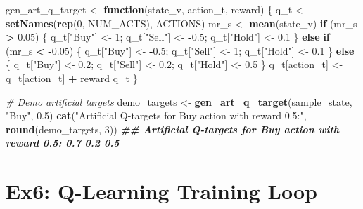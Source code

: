 \documentclass[
]{article}
\newenvironment{Shaded}{\begin{snugshade}}{\end{snugshade}}
\newcommand{\CommentTok}[1]{\textcolor[rgb]{0.56,0.35,0.01}{\textit{#1}}}
\newcommand{\ControlFlowTok}[1]{\textcolor[rgb]{0.13,0.29,0.53}{\textbf{#1}}}
\newcommand{\DecValTok}[1]{\textcolor[rgb]{0.00,0.00,0.81}{#1}}
\newcommand{\DocumentationTok}[1]{\textcolor[rgb]{0.56,0.35,0.01}{\textbf{\textit{#1}}}}
\newcommand{\FloatTok}[1]{\textcolor[rgb]{0.00,0.00,0.81}{#1}}
\newcommand{\FunctionTok}[1]{\textcolor[rgb]{0.13,0.29,0.53}{\textbf{#1}}}
\newcommand{\NormalTok}[1]{#1}
\newcommand{\OtherTok}[1]{\textcolor[rgb]{0.56,0.35,0.01}{#1}}
\newcommand{\SpecialCharTok}[1]{\textcolor[rgb]{0.81,0.36,0.00}{\textbf{#1}}}
\newcommand{\StringTok}[1]{\textcolor[rgb]{0.31,0.60,0.02}{#1}}
\begin{document}
\begin{Shaded}
\begin{Highlighting}[]
\NormalTok{gen\_art\_q\_target }\OtherTok{\textless{}{-}} \ControlFlowTok{function}\NormalTok{(state\_v, action\_t, reward) \{}
\NormalTok{  q\_t }\OtherTok{\textless{}{-}} \FunctionTok{setNames}\NormalTok{(}\FunctionTok{rep}\NormalTok{(}\DecValTok{0}\NormalTok{, NUM\_ACTS), ACTIONS)}
\NormalTok{  mr\_s }\OtherTok{\textless{}{-}} \FunctionTok{mean}\NormalTok{(state\_v)}
  \ControlFlowTok{if}\NormalTok{ (mr\_s }\SpecialCharTok{\textgreater{}} \FloatTok{0.05}\NormalTok{) \{ q\_t[}\StringTok{"Buy"}\NormalTok{] }\OtherTok{\textless{}{-}} \DecValTok{1}\NormalTok{; q\_t[}\StringTok{"Sell"}\NormalTok{] }\OtherTok{\textless{}{-}} \SpecialCharTok{{-}}\FloatTok{0.5}\NormalTok{; q\_t[}\StringTok{"Hold"}\NormalTok{] }\OtherTok{\textless{}{-}} \FloatTok{0.1}\NormalTok{ \}}
  \ControlFlowTok{else} \ControlFlowTok{if}\NormalTok{ (mr\_s }\SpecialCharTok{\textless{}} \SpecialCharTok{{-}}\FloatTok{0.05}\NormalTok{) \{ q\_t[}\StringTok{"Buy"}\NormalTok{] }\OtherTok{\textless{}{-}} \SpecialCharTok{{-}}\FloatTok{0.5}\NormalTok{; q\_t[}\StringTok{"Sell"}\NormalTok{] }\OtherTok{\textless{}{-}} \DecValTok{1}\NormalTok{; q\_t[}\StringTok{"Hold"}\NormalTok{] }\OtherTok{\textless{}{-}} \FloatTok{0.1}\NormalTok{ \}}
  \ControlFlowTok{else}\NormalTok{ \{ q\_t[}\StringTok{"Buy"}\NormalTok{] }\OtherTok{\textless{}{-}} \FloatTok{0.2}\NormalTok{; q\_t[}\StringTok{"Sell"}\NormalTok{] }\OtherTok{\textless{}{-}} \FloatTok{0.2}\NormalTok{; q\_t[}\StringTok{"Hold"}\NormalTok{] }\OtherTok{\textless{}{-}} \FloatTok{0.5}\NormalTok{ \}}
\NormalTok{  q\_t[action\_t] }\OtherTok{\textless{}{-}}\NormalTok{ q\_t[action\_t] }\SpecialCharTok{+}\NormalTok{ reward}
\NormalTok{  q\_t}
\NormalTok{\}}

\CommentTok{\# Demo artificial targets}
\NormalTok{demo\_targets }\OtherTok{\textless{}{-}} \FunctionTok{gen\_art\_q\_target}\NormalTok{(sample\_state, }\StringTok{"Buy"}\NormalTok{, }\FloatTok{0.5}\NormalTok{)}
\FunctionTok{cat}\NormalTok{(}\StringTok{"Artificial Q{-}targets for \textquotesingle{}Buy\textquotesingle{} action with reward 0.5:"}\NormalTok{, }\FunctionTok{round}\NormalTok{(demo\_targets, }\DecValTok{3}\NormalTok{))}
\DocumentationTok{\#\# Artificial Q{-}targets for \textquotesingle{}Buy\textquotesingle{} action with reward 0.5: 0.7 0.2 0.5}
\end{Highlighting}
\end{Shaded}

\hypertarget{ex6-q-learning-training-loop}{%
\section{Ex6: Q-Learning Training
Loop}\label{ex6-q-learning-training-loop}}
\end{document}
